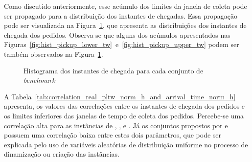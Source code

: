 
Como discutido anteriormente, esse acúmulo dos limites da janela de coleta pode
ser propagado para a distribuição dos instantes de chegadas.
Essa propagação pode ser visualizada na Figura~\ref{fig:hist_arrival_time}, que
apresenta as distribuições dos instantes de chegada dos pedidos.
Observa-se que alguns dos acúmulos apresentados nas 
Figuras~\ref{fig:hist_pickup_lower_tw}~e~\ref{fig:hist_pickup_upper_tw} podem 
ser também observados na Figura~\ref{fig:hist_arrival_time}.


\begin{figure}[h]
    \centering
    \caption{Histograma dos instantes de chegada para cada conjunto 
             de \textit{benchmark}}
    \label{fig:hist_arrival_time}
\end{figure}

A Tabela~\ref{tab:correlation_real_pltw_norm_h_and_arrival_time_norm_h} 
apresenta, os valores das correlações entre os instantes de chegada dos 
pedidos e os limites inferiores das janelas de tempo de coleta dos pedidos.
Percebe-se uma correlação alta para as instâncias de 
, 
, 
 e 
.
Já os conjuntos propostos por   e 
 possuem uma correlação baixa entre estes 
dois parâmetros, que pode ser explicada pelo uso de variáveis aleatórias de 
distribuição uniforme no processo de dinamização ou criação das instâncias.


